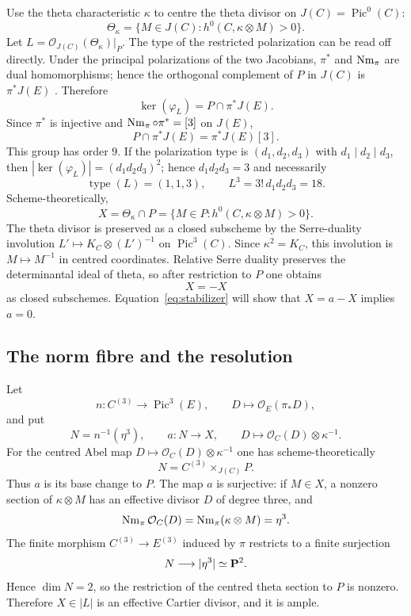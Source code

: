 Use the theta characteristic $\kappa$ to centre the theta divisor on
$J(C)=\operatorname{Pic}^0(C)$:
\[
 \Theta_\kappa=\{M\in J(C):h^0(C,\kappa\otimes M)>0\}.
\]
Let $L=\mathcal O_{J(C)}(\Theta_\kappa)|_P$.  The type of the restricted
polarization can be read off directly.  Under the principal polarizations of
the two Jacobians, $\pi^*$ and $\operatorname{Nm}_\pi$ are dual homomorphisms; hence the
orthogonal complement of $P$ in $J(C)$ is $\pi^*J(E)$
\cite[Section~12.3]{BirkenhakeLange2004}.  Therefore
\[
 \ker(\varphi_L)=P\cap\pi^*J(E).
\]
Since $\pi^*$ is injective and $\operatorname{Nm}_\pi\circ\pi^*=[3]$ on $J(E)$,
\[
 P\cap\pi^*J(E)=\pi^*J(E)[3].
\]
This group has order $9$.  If the polarization type is
$(d_1,d_2,d_3)$ with $d_1\mid d_2\mid d_3$, then
$|\ker(\varphi_L)|=(d_1d_2d_3)^2$; hence $d_1d_2d_3=3$ and necessarily
\begin{equation}
 \operatorname{type}(L)=(1,1,3),
 \qquad L^3=3!\,d_1d_2d_3=18.
\label{eq:prym-polarization}
\end{equation}
Scheme-theoretically,
\[
 X=\Theta_\kappa\cap P
  =\{M\in P:h^0(C,\kappa\otimes M)>0\}.
\]
The theta divisor is preserved as a closed subscheme by the Serre-duality
involution $L'\mapsto K_C\otimes(L')^{-1}$ on $\operatorname{Pic}^3(C)$.
Since $\kappa^2=K_C$, this involution is $M\mapsto M^{-1}$ in centred
coordinates.  Relative Serre duality preserves the determinantal ideal of
theta, so after restriction to $P$ one obtains
\begin{equation}
 X=-X
\label{eq:symmetry}
\end{equation}
as closed subschemes.  Equation~\eqref{eq:stabilizer} will show that
$X=a-X$ implies $a=0$.

\subsection{The norm fibre and the resolution}

Let
\[
 n:C^{(3)}\longrightarrow\operatorname{Pic}^3(E),
 \qquad D\longmapsto\mathcal O_E(\pi_*D),
\]
and put
\[
 N=n^{-1}(\eta^3),
 \qquad
 a:N\longrightarrow X,
 \qquad
 D\longmapsto\mathcal O_C(D)\otimes\kappa^{-1}.
\]
For the centred Abel map $D\mapsto\mathcal O_C(D)\otimes\kappa^{-1}$ one has
scheme-theoretically
\[
 N=C^{(3)}\times_{J(C)}P.
\]
Thus $a$ is its base change to $P$.  The map $a$ is surjective: if $M\in X$,
a nonzero section of $\kappa\otimes M$ has an effective divisor $D$ of
degree three, and
\[
 \operatorname{Nm}_\pi\mathcal O_C(D)
 =\operatorname{Nm}_\pi(\kappa\otimes M)=\eta^3.
\]
The finite morphism $C^{(3)}\to E^{(3)}$ induced by $\pi$ restricts to a
finite surjection
\[
 N\longrightarrow|\eta^3|\simeq\mathbf P^2.
\]
Hence $\dim N=2$, so the restriction of the centred theta section to $P$ is
nonzero.  Therefore $X\in|L|$ is an effective Cartier divisor, and it is
ample.

